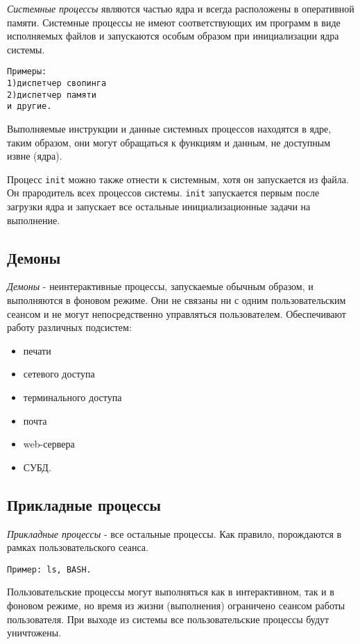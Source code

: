 \emph{Системные процессы} являются частью ядра и всегда расположены в оперативной памяти. Системные процессы не имеют соответствующих им программ в виде исполняемых файлов и запускаются особым образом при инициализации ядра системы.

\begin{verbatim}
Примеры:
1)диспетчер свопинга
2)диспетчер памяти
и другие.
\end{verbatim}

Выполняемые инструкции и данные системных процессов находятся в ядре, таким образом, они могут обращаться к функциям и данным, не доступным извне (ядра). 

Процесс \verb+init+ можно также отнести к системным, хотя он запускается из файла. Он прародитель всех процессов системы. \verb+init+ запускается первым после загрузки ядра и запускает все остальные инициализационные задачи на выполнение.

\subsection{Демоны}

\emph{Демоны} - неинтерактивные процессы, запускаемые обычным образом, и выполняются в фоновом режиме. Они не связаны ни с одним пользовательским сеансом и не могут непосредственно управляться пользователем. Обеспечивают работу различных подсистем: \begin{itemize}
\item печати
\item сетевого доступа
\item терминального доступа
\item почта
\item web-сервера
\item СУБД.
\end{itemize}

\subsection{Прикладные процессы}

\emph{Прикладные процессы} - все остальные процессы. Как правило, порождаются в рамках пользовательского сеанса. 

\verb+Пример: ls, BASH.+

Пользовательские процессы могут выполняться как в интерактивном, так и в фоновом режиме, но время из жизни (выполнения) ограничено сеансом работы пользователя. При выходе из системы все пользовательские процессы будут уничтожены.

